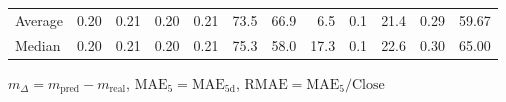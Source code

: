 \begin{threeparttable}
{\begin{tabular}{lrrrrrrrrrrr}
Average &          0.20 &          0.21 &          0.20 &        0.21 &                73.5 &                66.9 &        6.5 &                 0.1 &             21.4 &            0.29 &                  59.67 \\
 Median &          0.20 &          0.21 &          0.20 &        0.21 &                75.3 &                58.0 &       17.3 &                 0.1 &             22.6 &            0.30 &                  65.00 \\
\bottomrule
\end{tabular}
}
\begin{tablenotes}\footnotesize
\item $m_\Delta=m_{\text{pred}}-m_{\text{real}}$,
$\mathrm{MAE}_5=\mathrm{MAE}_{5\text{d}}$,
$\mathrm{RMAE}=\mathrm{MAE}_5/\text{Close}$
\end{tablenotes}
\end{threeparttable}
\endgroup

